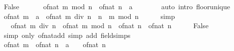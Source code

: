 \begin{isabellebody}
\ False\isanewline
\ \ \isamarkupfalse%
\ \isamarkupfalse%
\ {\isacharasterisk}{\kern0pt}{\isacharcolon}{\kern0pt}\ {\isachardoublequoteopen}{\isasymlfloor}of{\isacharunderscore}{\kern0pt}nat\ {\isacharparenleft}{\kern0pt}m\ mod\ n{\isacharparenright}{\kern0pt}\ {\isacharslash}{\kern0pt}\ of{\isacharunderscore}{\kern0pt}nat\ n\ {\isacharcolon}{\kern0pt}{\isacharcolon}{\kern0pt}\ {\isacharprime}{\kern0pt}a{\isasymrfloor}\ {\isacharequal}{\kern0pt}\ {}{\isachardoublequoteclose}\isanewline
\ \ \ \ \isamarkupfalse%
\ {\isacharparenleft}{\kern0pt}auto\ intro{\isacharcolon}{\kern0pt}\ floor{\isacharunderscore}{\kern0pt}unique{\isacharparenright}{\kern0pt}\isanewline
\ \ \isamarkupfalse%
\ {\isachardoublequoteopen}{\isacharparenleft}{\kern0pt}of{\isacharunderscore}{\kern0pt}nat\ m\ {\isacharcolon}{\kern0pt}{\isacharcolon}{\kern0pt}\ {\isacharprime}{\kern0pt}a{\isacharparenright}{\kern0pt}\ {\isacharequal}{\kern0pt}\ of{\isacharunderscore}{\kern0pt}nat\ {\isacharparenleft}{\kern0pt}m\ div\ n\ {\isacharasterisk}{\kern0pt}\ n\ {\isacharplus}{\kern0pt}\ m\ mod\ n{\isacharparenright}{\kern0pt}{\isachardoublequoteclose}\isanewline
\ \ \ \ \isamarkupfalse%
\ simp\isanewline
\ \ \isamarkupfalse%
\ \isamarkupfalse%
\ {\isachardoublequoteopen}{\isasymdots}\ {\isacharequal}{\kern0pt}\ {\isacharparenleft}{\kern0pt}of{\isacharunderscore}{\kern0pt}nat\ {\isacharparenleft}{\kern0pt}m\ div\ n{\isacharparenright}{\kern0pt}\ {\isacharplus}{\kern0pt}\ of{\isacharunderscore}{\kern0pt}nat\ {\isacharparenleft}{\kern0pt}m\ mod\ n{\isacharparenright}{\kern0pt}\ {\isacharslash}{\kern0pt}\ of{\isacharunderscore}{\kern0pt}nat\ n{\isacharparenright}{\kern0pt}\ {\isacharasterisk}{\kern0pt}\ of{\isacharunderscore}{\kern0pt}nat\ n{\isachardoublequoteclose}\isanewline
\ \ \ \ \isamarkupfalse%
\ False\ \isamarkupfalse%
\ {\isacharparenleft}{\kern0pt}simp\ only{\isacharcolon}{\kern0pt}\ of{\isacharunderscore}{\kern0pt}nat{\isacharunderscore}{\kern0pt}add{\isacharparenright}{\kern0pt}\ {\isacharparenleft}{\kern0pt}simp\ add{\isacharcolon}{\kern0pt}\ field{\isacharunderscore}{\kern0pt}simps{\isacharparenright}{\kern0pt}\isanewline
\ \ \isamarkupfalse%
\ \isamarkupfalse%
\ {\isachardoublequoteopen}{\isacharparenleft}{\kern0pt}of{\isacharunderscore}{\kern0pt}nat\ m\ {\isacharslash}{\kern0pt}\ of{\isacharunderscore}{\kern0pt}nat\ n\ {\isacharcolon}{\kern0pt}{\isacharcolon}{\kern0pt}\ {\isacharprime}{\kern0pt}a{\isacharparenright}{\kern0pt}\ {\isacharequal}{\kern0pt}\ {\isasymdots}\ {\isacharslash}{\kern0pt}\ of{\isacharunderscore}{\kern0pt}nat\ n{\isachardoublequoteclose}\isanewline

\end{isabellebody}
